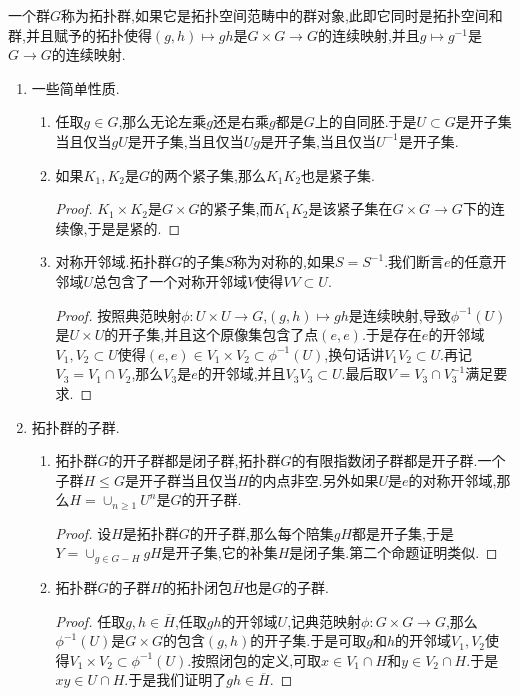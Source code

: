 一个群$G$称为拓扑群,如果它是拓扑空间范畴中的群对象,此即它同时是拓扑空间和群,并且赋予的拓扑使得$(g,h)\mapsto gh$是$G\times G\to G$的连续映射,并且$g\mapsto g^{-1}$是$G\to G$的连续映射.
\begin{enumerate}
	\item 一些简单性质.
	\begin{enumerate}[(1)]
		\item 任取$g\in G$,那么无论左乘$g$还是右乘$g$都是$G$上的自同胚.于是$U\subset G$是开子集当且仅当$gU$是开子集,当且仅当$Ug$是开子集,当且仅当$U^{-1}$是开子集.
		\item 如果$K_1,K_2$是$G$的两个紧子集,那么$K_1K_2$也是紧子集.
		\begin{proof}
			
			$K_1\times K_2$是$G\times G$的紧子集,而$K_1K_2$是该紧子集在$G\times G\to G$下的连续像,于是是紧的.
		\end{proof}
		\item 对称开邻域.拓扑群$G$的子集$S$称为对称的,如果$S=S^{-1}$.我们断言$e$的任意开邻域$U$总包含了一个对称开邻域$V$使得$VV\subset U$.
		\begin{proof}
			
			按照典范映射$\phi:U\times U\to G$,$(g,h)\mapsto gh$是连续映射,导致$\phi^{-1}(U)$是$U\times U$的开子集,并且这个原像集包含了点$(e,e)$.于是存在$e$的开邻域$V_1,V_2\subset U$使得$(e,e)\in V_1\times V_2\subset\phi^{-1}(U)$,换句话讲$V_1V_2\subset U$.再记$V_3=V_1\cap V_2$,那么$V_3$是$e$的开邻域,并且$V_3V_3\subset U$.最后取$V=V_3\cap V_3^{-1}$满足要求.
		\end{proof}
	\end{enumerate}
    \item 拓扑群的子群.
	\begin{enumerate}[(1)]
		\item 拓扑群$G$的开子群都是闭子群,拓扑群$G$的有限指数闭子群都是开子群.一个子群$H\le G$是开子群当且仅当$H$的内点非空.另外如果$U$是$e$的对称开邻域,那么$H=\cup_{n\ge1}U^n$是$G$的开子群.
		\begin{proof}
			
			设$H$是拓扑群$G$的开子群,那么每个陪集$gH$都是开子集,于是$Y=\cup_{g\in G-H}gH$是开子集,它的补集$H$是闭子集.第二个命题证明类似.
		\end{proof}
		\item 拓扑群$G$的子群$H$的拓扑闭包$\overline{H}$也是$G$的子群.
		\begin{proof}
			
			任取$g,h\in\overline{H}$,任取$gh$的开邻域$U$,记典范映射$\phi:G\times G\to G$,那么$\phi^{-1}(U)$是$G\times G$的包含$(g,h)$的开子集.于是可取$g$和$h$的开邻域$V_1,V_2$使得$V_1\times V_2\subset\phi^{-1}(U)$.按照闭包的定义,可取$x\in V_1\cap H$和$y\in V_2\cap H$.于是$xy\in U\cap H$.于是我们证明了$gh\in\overline{H}$.
			

\end{proof}
\end{enumerate}
\end{enumerate}
